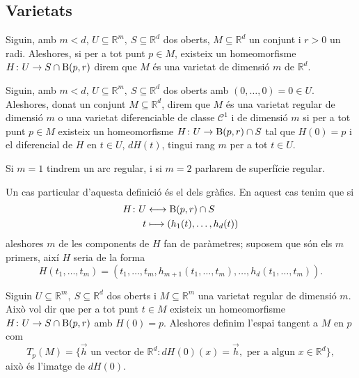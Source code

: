 \documentclass[../Apunts.tex]{subfiles}
\begin{document}
	\subsection{Varietats}
	\begin{definition}[Varietat]
		\label{def:varietat}
		Siguin, amb \(m<d\), \(U\subseteq\mathbb{R}^{m},\ S\subseteq\mathbb{R}^{d}\) dos oberts, \(M\subseteq\mathbb{R}^{d}\) un conjunt i \(r>0\) un radi. Aleshores, si per a tot punt \(p\in M\), existeix un homeomorfisme \(H\colon U\to S\cap\operatorname{B}(p,r)\) direm que \(M\) és una varietat de dimensió \(m\) de \(\mathbb{R}^{d}\).
	\end{definition} %
	\begin{definition}
		\label{def:varietat regular o diferenciable}
		Siguin, amb \(m<d\), \(U\subseteq\mathbb{R}^{m},\ S\subseteq\mathbb{R}^{d}\) dos oberts amb \((0,\dots,0)=0\in U\). Aleshores, donat un conjunt \(M\subseteq\mathbb{R}^{d}\), direm que \(M\) és una varietat regular de dimensió \(m\) o una varietat diferenciable de classe \(\mathcal{C}^{1}\) i de dimensió \(m\) si per a tot punt \(p\in M\) existeix un homeomorfisme \(H\colon U\to\operatorname{B}(p,r)\cap S\) tal que \(H(0)=p\) i el diferencial de \(H\) en \(t\in U\), \(dH(t)\), tingui rang \(m\) per a tot \(t\in U\). %
		
		Si \(m=1\) tindrem un arc regular, i si \(m=2\) parlarem de superfície regular.
	\end{definition}
	\begin{observation}
		Un cas particular d'aquesta definició és el dels gràfics. En aquest cas tenim que si
		\begin{align*}
		H\colon U&\longleftrightarrow\operatorname{B}(p,r)\cap S\\
		t&\longmapsto(h_{1}(t),\dots,h_{d}(t))
		\end{align*}
		aleshores \(m\) de les components de \(H\) fan de paràmetres; suposem que són els \(m\) primers, així \(H\) seria de la forma
		\[H(t_{1},\dots,t_{m})=(t_{1},\dots,t_{m},h_{m+1}(t_{1},\dots,t_{m}),\dots,h_{d}(t_{1},\dots,t_{m})).\] %
	\end{observation}
	\begin{definition}
		\label{def:espai tangent a una varietat regular en un punt}
		Siguin \(U\subseteq\mathbb{R}^{m},\ S\subseteq\mathbb{R}^{d}\) dos oberts i \(M\subseteq\mathbb{R}^{m}\) una varietat regular de dimensió \(m\). Això vol dir que per a tot punt \(t\in M\) existeix un homeomorfisme \(H\colon U\to S\cap\operatorname{B}(p,r)\) amb \(H(0)=p\). Aleshores definim l'espai tangent a \(M\) en \(p\) com
		\[T_{p}(M)=\{\vec{h}\text{ un vector de }\mathbb{R}^{d}\colon dH(0)(x)=\vec{h},\text{ per a algun }x\in\mathbb{R}^{d}\},\]
		això és l'imatge de \(dH(0)\).
	\end{definition}
\end{document}
